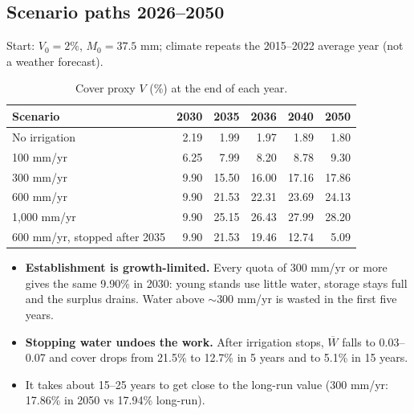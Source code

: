 \documentclass[11pt,a4paper]{article}
\newcommand{\Wb}{\overline W}
\begin{document}
\subsection{Scenario paths 2026--2050}
Start: $V_0=2\%$, $M_0=37.5$ mm; climate repeats the 2015--2022 average year (not a weather forecast).
\begin{table}[H]\centering\small
\begin{tabular}{@{}lrrrrr@{}}
\toprule
Scenario & 2030 & 2035 & 2036 & 2040 & 2050\\
\midrule
No irrigation & 2.19 & 1.99 & 1.97 & 1.89 & 1.80\\
100 mm/yr & 6.25 & 7.99 & 8.20 & 8.78 & 9.30\\
300 mm/yr & 9.90 & 15.50 & 16.00 & 17.16 & 17.86\\
600 mm/yr & 9.90 & 21.53 & 22.31 & 23.69 & 24.13\\
1,000 mm/yr & 9.90 & 25.15 & 26.43 & 27.99 & 28.20\\
600 mm/yr, stopped after 2035 & 9.90 & 21.53 & 19.46 & 12.74 & 5.09\\
\bottomrule
\end{tabular}
\caption{Cover proxy $V$ (\%) at the end of each year.}
\label{tab:scen}
\end{table}
\begin{itemize}
\item \textbf{Establishment is growth-limited.} Every quota of 300 mm/yr or more gives the same 9.90\% in 2030:
young stands use little water, storage stays full and the surplus drains. Water above $\sim$300 mm/yr is wasted in the first five years.
\item \textbf{Stopping water undoes the work.} After irrigation stops, $\Wb$ falls to 0.03--0.07 and cover drops from 21.5\% to 12.7\% in 5 years and to 5.1\% in 15 years.
\item It takes about 15--25 years to get close to the long-run value (300 mm/yr: 17.86\% in 2050 vs 17.94\% long-run).
\end{itemize}
\end{document}
